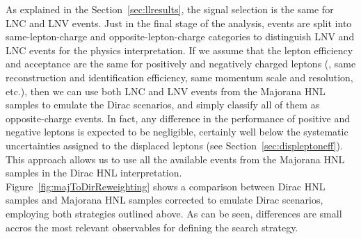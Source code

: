 As explained in the Section~\ref{sec:llresults}, the signal selection is the
same for LNC and LNV events. Just in the final stage of the analysis,
events are split into same-lepton-charge and opposite-lepton-charge
categories to distinguish LNV and LNC events for the physics
interpretation. If we assume that the lepton efficiency and
acceptance are the same for positively and negatively charged leptons
(\ie, same reconstruction and identification efficiency, same momentum
scale and resolution, etc.), then we can use both LNC and LNV events
from the Majorana HNL samples to emulate the Dirac scenarios, and
simply classify all of them as opposite-charge events. In fact, any
difference in the performance of positive and negative leptons is
expected to be negligible, certainly well below the systematic
uncertainties assigned to the displaced leptons (see
Section~\ref{sec:displeptoneff}).
This approach allows us to use all the available events from the
Majorana HNL samples in the Dirac HNL interpretation.\\
Figure~\ref{fig:majToDirReweighting} shows a comparison between Dirac
HNL samples and Majorana HNL samples corrected to emulate Dirac
scenarios, employing both strategies outlined above.
As can be seen, differences are small accros the most relevant observables  for defining the search strategy.
